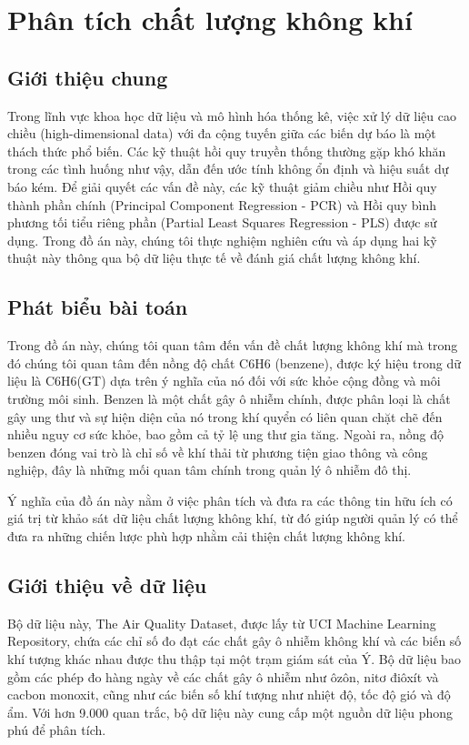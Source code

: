 \section{Phân tích chất lượng không khí}

\subsection{Giới thiệu chung}

Trong lĩnh vực khoa học dữ liệu và mô hình hóa thống kê, việc xử lý dữ liệu cao chiều (high-dimensional data) với đa cộng tuyến giữa các biến dự báo là một thách thức phổ biến. Các kỹ thuật hồi quy truyền thống thường gặp khó khăn trong các tình huống như vậy, dẫn đến ước tính không ổn định và hiệu suất dự báo kém. Để giải quyết các vấn đề này, các kỹ thuật giảm chiều như Hồi quy thành phần chính (Principal Component Regression - PCR) và Hồi quy bình phương tối tiểu riêng phần (Partial Least Squares Regression - PLS) được sử dụng. Trong đồ án này, chúng tôi thực nghiệm nghiên cứu và áp dụng hai kỹ thuật này thông qua bộ dữ liệu thực tế về đánh giá chất lượng không khí.

\subsection{Phát biểu bài toán}

Trong đồ án này, chúng tôi quan tâm đến vấn đề chất lượng không khí mà trong đó chúng tôi quan tâm đến nồng độ chất C6H6 (benzene), được ký hiệu trong dữ liệu là C6H6(GT) dựa trên ý nghĩa của nó đối với sức khỏe cộng đồng và môi trường môi sinh. Benzen là một chất gây ô nhiễm chính, được phân loại là chất gây ung thư và sự hiện diện của nó trong khí quyển có liên quan chặt chẽ đến nhiều nguy cơ sức khỏe, bao gồm cả tỷ lệ ung thư gia tăng. Ngoài ra, nồng độ benzen đóng vai trò là chỉ số về khí thải từ phương tiện giao thông và công nghiệp, đây là những mối quan tâm chính trong quản lý ô nhiễm đô thị.

Ý nghĩa của đồ án này nằm ở việc phân tích và đưa ra các thông tin hữu ích có giá trị từ khảo sát dữ liệu chất lượng không khí, từ đó giúp người quản lý có thể đưa ra những chiến lược phù hợp nhằm cải thiện chất lượng không khí.

\subsection{Giới thiệu về dữ liệu}

Bộ dữ liệu này, The Air Quality Dataset, được lấy từ UCI Machine Learning Repository, chứa các chỉ số đo đạt các chất gây ô nhiễm không khí và các biến số khí tượng khác nhau được thu thập tại một trạm giám sát của Ý. Bộ dữ liệu bao gồm các phép đo hàng ngày về các chất gây ô nhiễm như ôzôn, nitơ điôxít và cacbon monoxit, cũng như các biến số khí tượng như nhiệt độ, tốc độ gió và độ ẩm. Với hơn 9.000 quan trắc, bộ dữ liệu này cung cấp một nguồn dữ liệu phong phú để phân tích.

